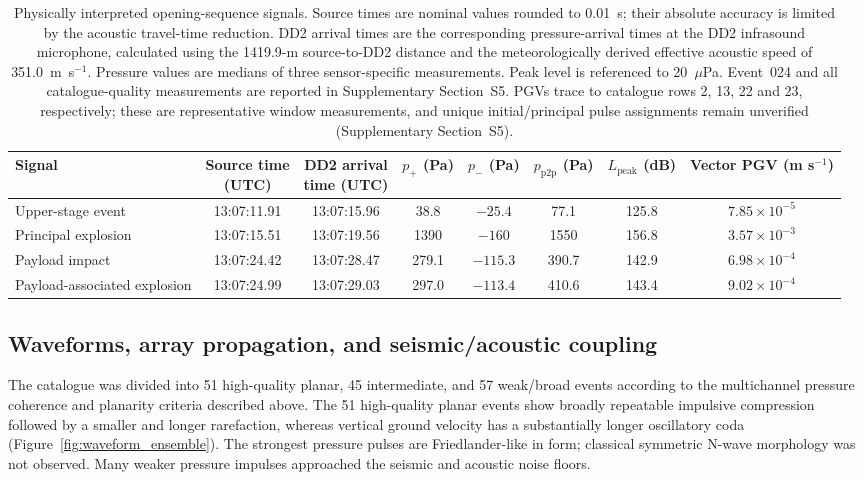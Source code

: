 \documentclass[]{seismica}
\begin{document}
\begin{table}[!tbp]
\caption{Physically interpreted opening-sequence signals. Source times are
nominal values rounded to 0.01~s; their absolute accuracy is limited by the
acoustic travel-time reduction. DD2 arrival times are the corresponding
pressure-arrival times at the DD2 infrasound microphone, calculated using the
1419.9-m source-to-DD2 distance and the meteorologically derived effective
acoustic speed of 351.0~m~s$^{-1}$. Pressure values are medians of three
sensor-specific measurements. Peak level is referenced to 20~$\mu$Pa.
Event~024 and all catalogue-quality measurements are reported in
Supplementary Section~S5. PGVs trace to catalogue rows 2, 13, 22 and 23,
respectively; these are representative window measurements, and unique
initial/principal pulse assignments remain unverified
(Supplementary Section~S5).}
\label{tab:principal_events}
\centering
\small
\begin{tabularx}{\textwidth}{Xccccccc}
\hline
Signal &
\shortstack{Source time\\(UTC)} &
\shortstack{DD2 arrival\\time (UTC)} &
$p_+$ (Pa) &
$p_-$ (Pa) &
$p_{\mathrm{p2p}}$ (Pa) &
\shortstack{$L_{\mathrm{peak}}$\\(dB)} &
\shortstack{Vector PGV\\(m s$^{-1}$)} \\
\hline
Upper-stage event &
13:07:11.91 &
13:07:15.96 &
38.8 &
$-25.4$ &
77.1 &
125.8 &
$7.85\times10^{-5}$ \\

Principal explosion &
13:07:15.51 &
13:07:19.56 &
1390 &
$-160$ &
1550 &
156.8 &
$3.57\times10^{-3}$ \\

Payload impact &
13:07:24.42 &
13:07:28.47 &
279.1 &
$-115.3$ &
390.7 &
142.9 &
$6.98\times10^{-4}$ \\

Payload-associated explosion &
13:07:24.99 &
13:07:29.03 &
297.0 &
$-113.4$ &
410.6 &
143.4 &
$9.02\times10^{-4}$ \\
\hline
\end{tabularx}
\end{table}
\FloatBarrier

\subsection{Waveforms, array propagation, and seismic/acoustic coupling}

The catalogue was divided into 51 high-quality planar, 45 intermediate, and
57 weak/broad events according to the multichannel pressure coherence and
planarity criteria described above. The 51 high-quality planar events show
broadly repeatable impulsive compression followed by a smaller and longer
rarefaction, whereas vertical ground velocity has a substantially longer
oscillatory coda (Figure~\ref{fig:waveform_ensemble}). The strongest pressure
pulses are Friedlander-like in form; classical symmetric N-wave morphology
was not observed. Many weaker pressure impulses approached the seismic and
acoustic noise floors.
\end{document}
